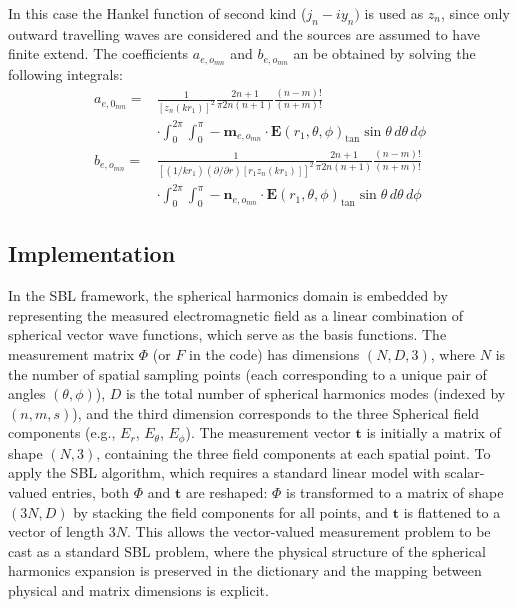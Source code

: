 \documentclass{article}
\begin{document}
In this case the Hankel function of second kind (\(j_n-iy_n)\) is used as \(z_n\), since only outward travelling waves are considered and the sources are assumed to have finite extend. The coefficients \(a_{e,o_{mn}}\) and \(b_{e,o_{mn}}\) an be obtained by solving the following integrals:
\begin{equation}
    \begin{split}
        a_{e,0_{mn}} =& \frac{1}{\left[z_n(kr_1)\right]^2} \frac{2n+1}{\pi 2n (n+1)} \frac{(n-m)!}{(n+m)!} \\
        &\cdot \int_0^{2\pi} \int_0^{\pi} -\mathbf{m}_{e,o_{mn}} \cdot \mathbf{E}(r_1, \theta, \phi)_{\tan} \sin \theta \, d\theta \, d\phi\\
        b_{e,o_{mn}} = &\frac{1}{\left[(1/kr_1)(\partial/\partial r) [r_1 z_n(kr_1)]\right]^2} \frac{2n + 1}{\pi 2n (n+1)} \frac{(n - m)!}{(n + m)!}\\
        &\cdot \int_0^{2\pi} \int_0^{\pi} -\mathbf{n}_{e,o_{mn}} \cdot \mathbf{E}(r_1, \theta, \phi)_{\tan} \sin \theta \, d\theta \, d\phi
    \end{split}
\end{equation}

\subsection{Implementation}
In the SBL framework, the spherical harmonics domain is embedded by representing the measured electromagnetic field as a linear combination of spherical vector wave functions, which serve as the basis functions. The measurement matrix $\Phi$ (or $F$ in the code) has dimensions $(N, D, 3)$, where $N$ is the number of spatial sampling points (each corresponding to a unique pair of angles $(\theta, \phi)$), $D$ is the total number of spherical harmonics modes (indexed by $(n, m, s)$), and the third dimension corresponds to the three Spherical field components (e.g., $E_r$, $E_\theta$, $E_\phi$). The measurement vector $\mathbf{t}$ is initially a matrix of shape $(N, 3)$, containing the three field components at each spatial point. To apply the SBL algorithm, which requires a standard linear model with scalar-valued entries, both $\Phi$ and $\mathbf{t}$ are reshaped: $\Phi$ is transformed to a matrix of shape $(3N, D)$ by stacking the field components for all points, and $\mathbf{t}$ is flattened to a vector of length $3N$. This allows the vector-valued measurement problem to be cast as a standard SBL problem, where the physical structure of the spherical harmonics expansion is preserved in the dictionary and the mapping between physical and matrix dimensions is explicit.




\end{document}
